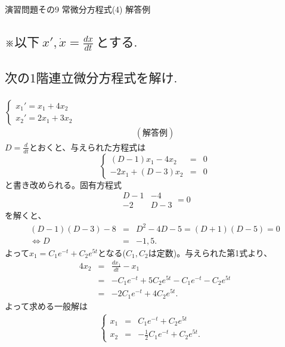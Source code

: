 \documentclass[a4paper,11pt,fleqn]{jarticle}
\begin{document}
\begin{center}
\begin{Large}
演習問題その9  常微分方程式(4) 解答例
\end{Large}
\end{center}

\subsection*{$※以下~x',\dot{x}=\frac{dx}{dt}~とする.$}
\subsection{$次の1階連立微分方程式を解け.$}
\subsubsection{}
$\left\{ \begin{array}{l}
x_1'=x_1+4x_2 \\
x_2'=2x_1+3x_2
\end{array} \right.$
\begin{eqnarray*}
(解答例)
\end{eqnarray*}
$D=\frac d{dt}$とおくと、与えられた方程式は
\[
\left\{
\begin{array}{rcl}
(D-1)x_1-4x_2 &=& 0 \\
-2x_1+(D-3)x_2 &=& 0
\end{array}
\right.
\]
と書き改められる。固有方程式
\[
\begin{array}{|cc|}
D-1 & -4 \\
-2 & D-3
\end{array}
=0
\]
を解くと、
\begin{eqnarray*}
(D-1)(D-3)-8&=&D^2-4D-5=(D+1)(D-5)=0 \\
\Leftrightarrow D &=& -1,5.
\end{eqnarray*}
よって$x_1=C_1e^{-t}+C_2e^{5t}$となる($C_1,C_2$は定数)。与えられた第1式より、
\begin{eqnarray*}
4x_2 &=& \frac{dx_1}{dt}-x_1 \\
&=& -C_1e^{-t}+5C_2e^{5t}-C_1e^{-t}-C_2e^{5t} \\
&=& -2C_1e^{-t}+4C_2e^{5t}.
\end{eqnarray*}
よって求める一般解は
\begin{eqnarray*}
\left\{ \begin{array}{rcl}
x_1&=&C_1e^{-t}+C_2e^{5t} \\
x_2&=&-\frac12C_1e^{-t}+C_2e^{5t}. \ \ \ \ 
\end{array}\right.
\end{eqnarray*}
\end{document}
